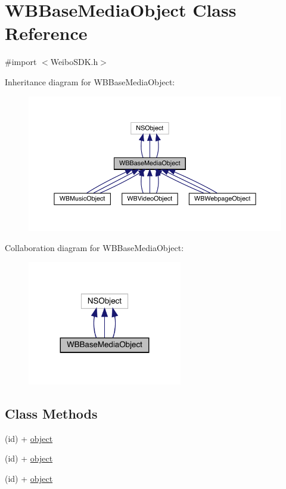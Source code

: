 \hypertarget{interface_w_b_base_media_object}{}\section{W\+B\+Base\+Media\+Object Class Reference}
\label{interface_w_b_base_media_object}


{\ttfamily \#import $<$Weibo\+S\+D\+K.\+h$>$}



Inheritance diagram for W\+B\+Base\+Media\+Object\+:\nopagebreak
\begin{figure}[H]
\begin{center}
\leavevmode
\includegraphics[width=350pt]{interface_w_b_base_media_object__inherit__graph}
\end{center}
\end{figure}


Collaboration diagram for W\+B\+Base\+Media\+Object\+:\nopagebreak
\begin{figure}[H]
\begin{center}
\leavevmode
\includegraphics[width=191pt]{interface_w_b_base_media_object__coll__graph}
\end{center}
\end{figure}
\subsection*{Class Methods}
\begin{DoxyCompactItemize}
\item 
(id) + \mbox{\hyperlink{interface_w_b_base_media_object_ab2df3d8d124732859fa7ebf5b9f3362f}{object}}
\item 
(id) + \mbox{\hyperlink{interface_w_b_base_media_object_ab2df3d8d124732859fa7ebf5b9f3362f}{object}}
\item 
(id) + \mbox{\hyperlink{interface_w_b_base_media_object_ab2df3d8d124732859fa7ebf5b9f3362f}{object}}
\end{DoxyCompactItemize}
